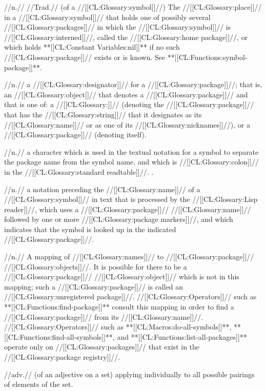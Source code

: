  //n.// //Trad.// (of a //[[CL:Glossary:symbol]]//) The //[[CL:Glossary:place]]// in a //[[CL:Glossary:symbol]]// that holds one of possibly several //[[CL:Glossary:packages]]// in which the //[[CL:Glossary:symbol]]// is //[[CL:Glossary:interned]]//, called the //[[CL:Glossary:home package]]//, or which holds **[[CL:Constant Variables:nil]]** if no such //[[CL:Glossary:package]]// exists or is known. See **[[CL:Functions:symbol-package]]**.

 //n.// a //[[CL:Glossary:designator]]// for a //[[CL:Glossary:package]]//; that is, an //[[CL:Glossary:object]]// that denotes a //[[CL:Glossary:package]]// and that is one of: a //[[CL:Glossary:\packagenamedesignator]]// (denoting the //[[CL:Glossary:package]]// that has the //[[CL:Glossary:string]]// that it designates as its //[[CL:Glossary:name]]// or as one of its //[[CL:Glossary:nicknames]]//), or a //[[CL:Glossary:package]]// (denoting itself).

 //n.// a character which is used in the textual notation for a symbol to separate the package name from the symbol name, and which is //[[CL:Glossary:colon]]// in the //[[CL:Glossary:standard readtable]]//. \Seesection\CharacterSyntax.


 //n.// a notation preceding the //[[CL:Glossary:name]]// of a //[[CL:Glossary:symbol]]// in text that is processed by the //[[CL:Glossary:Lisp reader]]//, which uses a //[[CL:Glossary:package]]// //[[CL:Glossary:name]]// followed by one or more //[[CL:Glossary:package markers]]//, and which indicates that the symbol is looked up in the indicated //[[CL:Glossary:package]]//.

 //n.// A mapping of //[[CL:Glossary:names]]// to //[[CL:Glossary:package]]// //[[CL:Glossary:objects]]//. It is possible for there to be a //[[CL:Glossary:package]]// //[[CL:Glossary:object]]// which is not in this mapping; such a //[[CL:Glossary:package]]// is called an //[[CL:Glossary:unregistered package]]//. //[[CL:Glossary:Operators]]// such as **[[CL:Functions:find-package]]** consult this mapping in order to find a //[[CL:Glossary:package]]// from its //[[CL:Glossary:name]]//. //[[CL:Glossary:Operators]]// such as **[[CL:Macros:do-all-symbols]]**, **[[CL:Functions:find-all-symbols]]**, and **[[CL:Functions:list-all-packages]]** operate only on //[[CL:Glossary:packages]]// that exist in the //[[CL:Glossary:package registry]]//.

 //adv.// (of an adjective on a set) applying individually to all possible pairings of elements of the set. 

